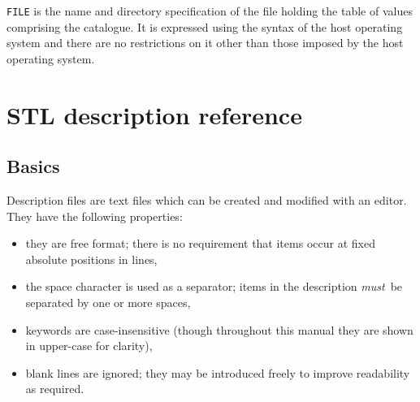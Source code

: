 \documentclass[twoside,11pt]{starlink}
\begin{document}
\begin{itemize}
   \texttt{FILE} is the name and directory specification of the file
   holding the table of values comprising the catalogue.  It is
   expressed using the syntax of the host operating system and there
   are no restrictions on it other than those imposed by the host
   operating system.


\end{itemize}


\section{\label{STLREF}STL description reference}

\subsection{Basics}

Description files are text files which can be created and modified
with an editor.  They have the following properties:

\begin{itemize}

  \item they are free format; there is no requirement that items occur
   at fixed absolute positions in lines,

  \item the space character is used as a separator; items in the
   description \textit{must}\, be separated by one or more spaces,

  \item keywords are case-insensitive (though throughout this manual they
   are shown in upper-case for clarity),

  \item blank lines are ignored; they may be introduced freely to
   improve readability as required.

\end{itemize}
\end{document}
